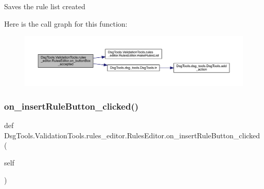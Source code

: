 \begin{DoxyVerb}Saves the rule list created
\end{DoxyVerb}
 Here is the call graph for this function\+:
\nopagebreak
\begin{figure}[H]
\begin{center}
\leavevmode
\includegraphics[width=350pt]{class_dsg_tools_1_1_validation_tools_1_1rules__editor_1_1_rules_editor_a6be23e41b64b56984b901dc1241f0e34_cgraph}
\end{center}
\end{figure}
\mbox{\label{class_dsg_tools_1_1_validation_tools_1_1rules__editor_1_1_rules_editor_a0e17e38094800661106fa99e6b557413}} 
\subsubsection{\texorpdfstring{on\+\_\+insert\+Rule\+Button\+\_\+clicked()}{on\_insertRuleButton\_clicked()}}
{\footnotesize\ttfamily def Dsg\+Tools.\+Validation\+Tools.\+rules\+\_\+editor.\+Rules\+Editor.\+on\+\_\+insert\+Rule\+Button\+\_\+clicked (\begin{DoxyParamCaption}\item[{}]{self }\end{DoxyParamCaption})}

